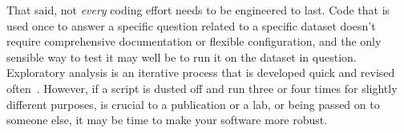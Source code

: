 \documentclass[10pt,letterpaper]{article}
\begin{document}
That said, not \emph{every} coding effort needs to be engineered to
last.  Code that is used once to answer a specific question related to
a specific dataset doesn't require comprehensive documentation or
flexible configuration, and the only sensible way to test it may well
be to run it on the dataset in question. Exploratory analysis is an
iterative process that is developed quick and revised
often~\cite{lawlor2015,sanders2008}.  However, if a script is dusted
off and run three or four times for slightly different purposes, is
crucial to a publication or a lab, or being passed on to someone else,
it may be time to make your software more robust.


\end{document}
